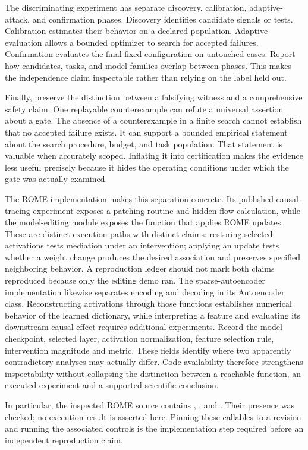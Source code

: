 The discriminating experiment has separate discovery, calibration, adaptive-attack, and confirmation phases. Discovery identifies candidate signals or tests. Calibration estimates their behavior on a declared population. Adaptive evaluation allows a bounded optimizer to search for accepted failures. Confirmation evaluates the final fixed configuration on untouched cases. Report how candidates, tasks, and model families overlap between phases. This makes the independence claim inspectable rather than relying on the label held out.

Finally, preserve the distinction between a falsifying witness and a comprehensive safety claim. One replayable counterexample can refute a universal assertion about a gate. The absence of a counterexample in a finite search cannot establish that no accepted failure exists. It can support a bounded empirical statement about the search procedure, budget, and task population. That statement is valuable when accurately scoped. Inflating it into certification makes the evidence less useful precisely because it hides the operating conditions under which the gate was actually examined.

The ROME implementation makes this separation concrete. Its published causal-tracing experiment exposes a patching routine and hidden-flow calculation, while the model-editing module exposes the function that applies ROME updates\cite{meng2022rome}. These are distinct execution paths with distinct claims: restoring selected activations tests mediation under an intervention; applying an update tests whether a weight change produces the desired association and preserves specified neighboring behavior. A reproduction ledger should not mark both claims reproduced because only the editing demo ran. The sparse-autoencoder implementation likewise separates encoding and decoding in its Autoencoder class\cite{gao2024sae}. Reconstructing activations through those functions establishes numerical behavior of the learned dictionary, while interpreting a feature and evaluating its downstream causal effect requires additional experiments. Record the model checkpoint, selected layer, activation normalization, feature selection rule, intervention magnitude and metric. These fields identify where two apparently contradictory analyses may actually differ. Code availability therefore strengthens inspectability without collapsing the distinction between a reachable function, an executed experiment and a supported scientific conclusion.

In particular, the inspected ROME source contains , ,  and . Their presence was checked; no execution result is asserted here. Pinning these callables to a revision and running the associated controls is the implementation step required before an independent reproduction claim.
